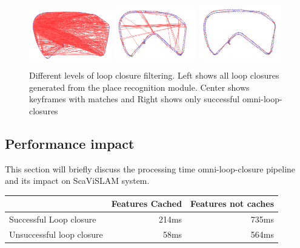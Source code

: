 \begin{figure}[h]
  \centering
    \includegraphics[width=0.32\textwidth]{chapters/images/all}
    \includegraphics[width=0.32\textwidth]{chapters/images/half_fail}
    \includegraphics[width=0.32\textwidth]{chapters/images/omni_above}
  \caption{Different levels of loop closure filtering.  Left shows all loop closures generated from the place recognition module.  Center shows keyframes with matches and Right shows only successful omni-loop-closures}
  \label{fig:place_recog_stats}
\end{figure}

\subsection{Performance impact}

This section will briefly discuss the processing time omni-loop-closure pipeline and its impact on ScaViSLAM system.

\begin{table}[h]
  \centering
    \begin{tabular}{ p{5cm} r r} %
    \toprule
     & Features Cached & Features not caches \\
    \midrule
    Successful Loop closure   & 214ms & 735ms \\
    Unsuccessful loop closure & 58ms  & 564ms \\
    \bottomrule
    \end{tabular}
  \label{tab:timing_results}
\end{table}

